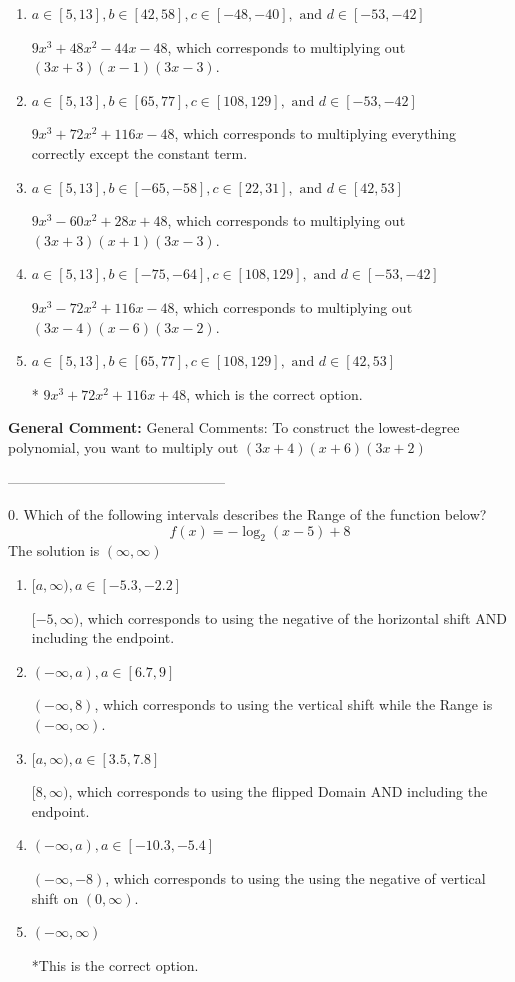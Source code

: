 \documentclass{extbook}[14pt]
\begin{document}
\begin{enumerate}[label=\Alph*.] 
\item $ a \in [5, 13], b \in [42, 58], c \in [-48, -40], \text{ and } d \in [-53, -42] $ 

 $9x^{3} +48 x^{2} -44 x -48$, which corresponds to multiplying out $(3x + 3)(x -1)(3x -3)$. 
\item $ a \in [5, 13], b \in [65, 77], c \in [108, 129], \text{ and } d \in [-53, -42] $ 

 $9x^{3} +72 x^{2} +116 x -48$, which corresponds to multiplying everything correctly except the constant term. 
\item $ a \in [5, 13], b \in [-65, -58], c \in [22, 31], \text{ and } d \in [42, 53] $ 

 $9x^{3} -60 x^{2} +28 x + 48$, which corresponds to multiplying out $(3x + 3)(x + 1)(3x -3)$. 
\item $ a \in [5, 13], b \in [-75, -64], c \in [108, 129], \text{ and } d \in [-53, -42] $ 

 $9x^{3} -72 x^{2} +116 x -48$, which corresponds to multiplying out $(3x -4)(x -6)(3x -2)$. 
\item $ a \in [5, 13], b \in [65, 77], c \in [108, 129], \text{ and } d \in [42, 53] $ 

 * $9x^{3} +72 x^{2} +116 x + 48$, which is the correct option. 
\end{enumerate} 
 
\textbf{General Comment:} General Comments: To construct the lowest-degree polynomial, you want to multiply out $(3x + 4)(x + 6)(3x + 2)$ 

-----------------------------------------------

0. Which of the following intervals describes the Range of the function below?
\[ f(x) = -\log_2{(x-5)}+8 \] 
The solution is $ (\infty, \infty) $ 

\begin{enumerate}[label=\Alph*.] 
\item $ [a, \infty), a \in [-5.3, -2.2] $ 

 $[-5, \infty)$, which corresponds to using the negative of the horizontal shift AND including the endpoint. 
\item $ (-\infty, a), a \in [6.7, 9] $ 

 $(-\infty, 8)$, which corresponds to using the vertical shift while the Range is $(-\infty, \infty)$. 
\item $ [a, \infty), a \in [3.5, 7.8] $ 

 $[8, \infty)$, which corresponds to using the flipped Domain AND including the endpoint. 
\item $ (-\infty, a), a \in [-10.3, -5.4] $ 

 $(-\infty, -8)$, which corresponds to using the using the negative of vertical shift on $(0, \infty)$. 
\item $ (-\infty, \infty) $ 

 *This is the correct option. 
\end{enumerate} 
 
\end{document}

